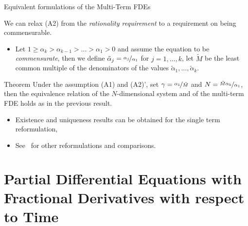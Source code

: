 \documentclass[aspectratio=169,xcolor=dvipsnames]{beamer}
\begin{document}
\begin{frame}{Equivalent formulations of the Multi-Term FDEs}

We can relax \alert{(A2)} from the \emph{rationality requirement} to a requirement on being commensurable\footnotemark[2].
\begin{itemize}
	\item[(A2)'] Let $1 \geq \alpha_k > \alpha_{k-1} > \ldots > \alpha_1 > 0$ and assume the equation to be \emph{commensurate}, then we define $\tilde{\alpha}_j = \nicefrac{\alpha_j}{\alpha_1}$ for $j=1,\ldots,k$, let $\tilde{M}$ be the least common multiple of the denominators of the values $\tilde{\alpha}_1,\ldots,\tilde{\alpha}_k$.
\end{itemize} 

\begin{alertblock}{Theorem \parencite[Theorem~8.2]{DiethelmBook}}
Under the assumption \alert{(A1)} and \alert{(A2)'}, set $\gamma = \nicefrac{\alpha_1}{\tilde{M}}$ and $N = \nicefrac{\tilde{M}\alpha_k}{\alpha_1}$, then the equivalence relation of the $N$-dimensional system and of the multi-term FDE holds as in the previous result.
\end{alertblock}

\begin{itemize}
	\item[\faLightbulb]<2-> Existence and uniqueness results can be obtained for the single term reformulation,
	\item[\faCog]<3-> See~\parencite{MR2527892} for other reformulations and comparisons.
\end{itemize}


\end{frame}

\section{Partial Differential Equations with Fractional Derivatives with respect to Time}
\end{document}
